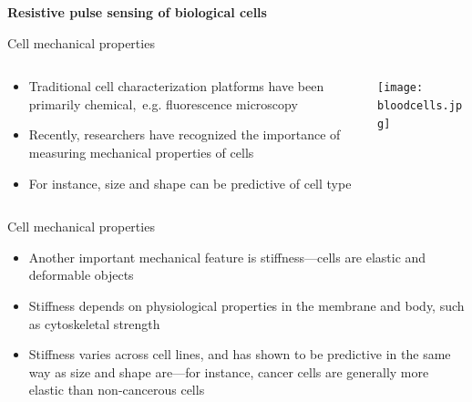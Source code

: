 \begin{frame}[c]{}
	\begin{center}
		\textbf{Resistive pulse sensing of biological cells}
	\end{center}
\end{frame}






\begin{frame}[c]{Cell mechanical properties}
	\begin{columns}[t]
		\begin{column}[T]{2.25in}
			\begin{itemize}
				\item Traditional cell characterization platforms have been primarily chemical,~e.g. fluorescence microscopy
				\item Recently, researchers have recognized the importance of measuring mechanical properties of cells
				\item For instance, size and shape can be predictive of cell type
			\end{itemize}
		\end{column}
		
		
		\begin{column}[T]{2.25in}
			\texttt{[image: bloodcells.jpg]}
		\end{column}


	\end{columns}

	

\end{frame}




\begin{frame}[c]{Cell mechanical properties}
	\begin{itemize}
		\item Another important mechanical feature is stiffness---cells are elastic and deformable objects
		\item Stiffness depends on physiological properties in the membrane and body, such as cytoskeletal strength
		\item Stiffness varies across cell lines, and has shown to be predictive in the same way as size and shape are---for instance, cancer cells are generally more elastic than non-cancerous cells
		
	\end{itemize}

\end{frame}


